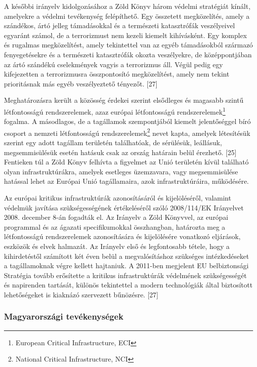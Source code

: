 \documentclass[12pt,magyar,a4paper,oneside]{scrreprt}
\begin{document}
A későbbi irányelv kidolgozásához a Zöld Könyv három védelmi stratégiát
kínált, amelyekre a védelmi tevékenység felépíthető. Egy összetett
megközelítés, amely a szándékos, ártó jelleg támadásokkal és a
természeti katasztrófák veszélyeivel egyaránt számol, de a terrorizmust
nem kezeli kiemelt kihívásként. Egy komplex és rugalmas megközelítést,
amely tekintettel van az egyéb támadásokból származó fenyegetésekre és a
természeti katasztrófák okozta veszélyekre, de középpontjában az ártó
szándékú cselekmények vagyis a terrorizmus áll. Végül pedig egy
kifejezetten a terrorizmusra összpontosító megközelítést, amely nem
tekint prioritásnak más egyéb veszélyeztető tényezőt. {[}27{]}

Meghatározásra került a közösség érdekei szerint elsődleges és magasabb
szintű létfontosságú rendszerelemek, azaz európai létfontosságú
rendszerelemek\footnote{European Critical Infrastructure, ECI} fogalma.
A másodlagos, de a tagállamok szempontjából kiemelt jelentőséggel bíró
csoport a nemzeti létfontosságú rendszerelemek\footnote{National
  Critical Infrastructure, NCI} nevet kapta, amelyek létesítésük szerint
egy adott tagállam területén találhatóak, de sérülésük, leállásuk,
megsemmisülésük esetén hatásuk csak az ország határain belül érezhető.
{[}25{]} Fentieken túl a Zöld Könyv felhívta a figyelmet az Unió
területén kívül található olyan infrastruktúrákra, amelyek esetleges
üzemzavara, vagy megsemmisülése hatással lehet az Európai Unió
tagállamaira, azok infrastruktúráira, működésére.

Az európai kritikus infrastruktúrák azonosításáról és kijelöléséről,
valamint védelmük javítása szükségességének értékeléséről szóló
2008/114/EK Irányelvet 2008. december 8-án fogadták el. Az Irányelv a
Zöld Könyvvel, az európai programmal és az ágazati specifikumokkal
összhangban, határozta meg a létfontosságú rendszerelemek azonosítására
és kijelölésére vonatkozó eljárások, eszközök és elvek halmazát. Az
Irányelv első és legfontosabb tétele, hogy a kihirdetéstől számított két
éven belül a megvalósításhoz szükséges intézkedéseket a tagállamoknak
végre kellett hajtaniuk. A 2011-ben megjelent EU belbiztonsági Stratégia
tovább erősítette a kritikus infrastruktúrák védelmének szükségességét
és napirenden tartását, különös tekintettel a modern technológiák által
biztosított lehetőségeket is kiaknázó szervezett bűnözésre. {[}27{]}

\hypertarget{magyarorszuxe1gi-tevuxe9kenysuxe9gek}{%
\subsubsection{Magyarországi
tevékenységek}\label{magyarorszuxe1gi-tevuxe9kenysuxe9gek}}
\end{document}
